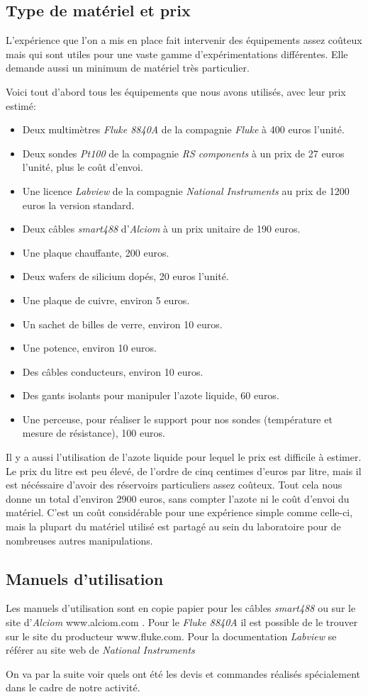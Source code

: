 \subsection{Type de matériel et prix}
L'expérience que l'on a mis en place fait intervenir des équipements assez coûteux mais qui sont utiles pour une vaste gamme d'expérimentations différentes. Elle demande aussi un minimum de matériel très particulier.

\bigskip
Voici tout d'abord tous les équipements que nous avons utilisés, avec leur prix estimé:

\begin{itemize}
  \item Deux multimètres \emph{Fluke 8840A} de la compagnie \emph{Fluke} à 400 euros l'unité.
  \item Deux sondes \emph{Pt100} de la compagnie \emph{RS components} à un prix de 27 euros l'unité, plus le coût d'envoi.
  \item Une licence \emph{Labview} de la compagnie \emph{National Instruments} au prix de 1200 euros la version standard.
  \item Deux câbles \emph{smart488} d'\emph{Alciom} à un prix unitaire de 190 euros.
  \item Une plaque chauffante, 200 euros.
  \item Deux wafers de silicium dopés, 20 euros l'unité.
  \item Une plaque de cuivre, environ 5 euros.
  \item Un sachet de billes de verre, environ 10 euros.
  \item Une potence, environ 10 euros. 
  \item Des câbles conducteurs, environ 10 euros.
  \item Des gants isolants pour manipuler l'azote liquide, 60 euros.
  \item Une perceuse, pour réaliser le support pour nos sondes (température et mesure de résistance), 100 euros.
\end{itemize}

\bigskip
Il y a aussi l'utilisation de l'azote liquide pour lequel le prix est difficile à estimer. Le prix du litre est peu élevé, de l'ordre de cinq centimes d'euros par litre, mais il est nécéssaire d'avoir des réservoirs particuliers assez coûteux.
Tout cela nous donne un total d'environ 2900 euros, sans compter l'azote ni le coût d'envoi du matériel.
C'est un coût considérable pour une expérience simple comme celle-ci, mais la plupart du matériel utilisé est partagé au sein du laboratoire pour de nombreuses autres manipulations.


\subsection{Manuels d'utilisation}
Les manuels d'utilisation sont en copie papier pour les câbles \emph{smart488} ou sur le site d'\emph{Alciom} www.alciom.com . Pour le \emph{Fluke 8840A} il est possible de le trouver sur le site du producteur www.fluke.com. Pour la documentation \emph{Labview} se référer au site web de \emph{National Instruments}

On va par la suite voir quels ont été les devis et commandes réalisés spécialement dans le cadre de notre activité.
